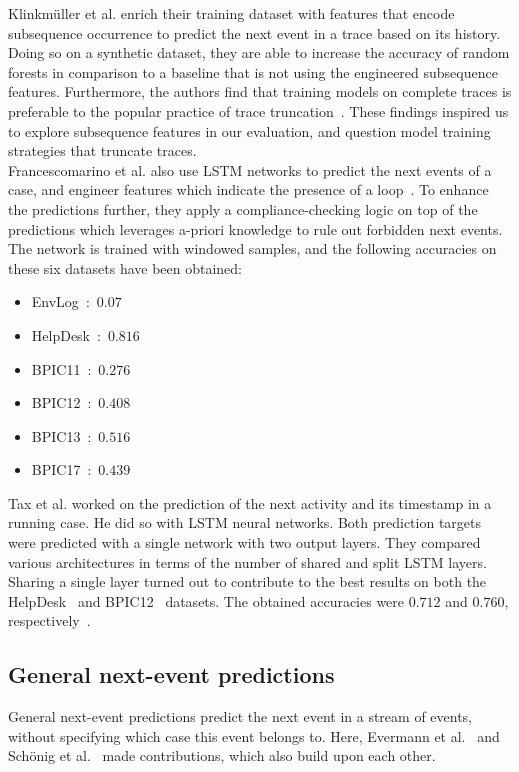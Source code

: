 Klinkmüller et al. enrich their training dataset with features that encode subsequence occurrence to predict the next event in a trace based on its history. Doing so on a synthetic dataset, they are able to increase the accuracy of random forests in comparison to a baseline that is not using the engineered subsequence features.
Furthermore, the authors find that training models on complete traces is preferable to the popular practice of trace truncation~\cite{klinkmuller2018reliablemonitoring}.
These findings inspired us to explore subsequence features in our evaluation, and question model training strategies that truncate traces.\\

Francescomarino et al. also use LSTM networks to predict the next events of a case, and engineer features which indicate the presence of a loop~\cite{francescomarino2017}. To enhance the predictions further, they apply a compliance-checking logic on top of the predictions which leverages a-priori knowledge to rule out forbidden next events. The network is trained with windowed samples, and the following accuracies on these six datasets have been obtained:

\begin{itemize}
  \item EnvLog~\cite{EnvLog}:~$0.07$
  \item HelpDesk~\cite{Helpdesk}:~$0.816$
  \item BPIC11~\cite{BPIC2011}:~$0.276$
  \item BPIC12~\cite{BPIC2012}:~$0.408$
  \item BPIC13~\cite{BPIC2013}:~$0.516$
  \item BPIC17~\cite{BPIC2017}:~$0.439$
\end{itemize}

Tax et al. worked on the prediction of the next activity and its timestamp in a running case. He did so with LSTM neural networks. Both prediction targets were predicted with a single network with two output layers. They compared various architectures in terms of the number of shared and split LSTM layers. Sharing a single layer turned out to contribute to the best results on both the HelpDesk~\cite{Helpdesk} and BPIC12~\cite{BPIC2012} datasets. The obtained accuracies were $0.712$ and $0.760$, respectively~\cite{tax2017}.

\subsection*{General next-event predictions}
General next-event predictions predict the next event in a stream of events, without specifying which case this event belongs to. Here, Evermann et al.~\cite{evermann2016} and Schönig et al.~\cite{schoenig2018} made contributions, which also build upon each other.

